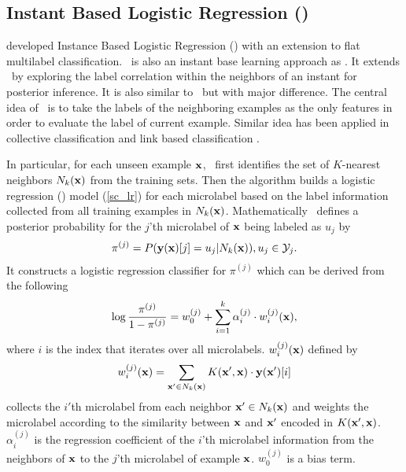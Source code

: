 {%
%
\subsection{Instant Based Logistic Regression (\iblr)} \label{sc_iblr}

\citet{Cheng09combining} developed Instance Based Logistic Regression (\iblr) with an extension to flat multilabel classification.
\iblr\ is also an instant base learning approach \citep{Aha91instance} as \mlknn.
It extends \mlknn\ by exploring the label correlation within the neighbors of an instant for posterior inference.
It is also similar to \cc\ but with major difference.
The central idea of \iblr\ is to take the labels of the neighboring examples as the only features in order to evaluate the label of current example.
Similar idea has been applied in collective classification \citep{Ghamrawi05collective} and link based classification \citep{Getoor05link, Getoor07introduction}.

In particular, for each unseen example $\mathbf {x}$, \iblr\ first identifies the set of $K$-nearest neighbors $N_k(\mathbf {x})$ from the training sets.
Then the algorithm builds a logistic regression (\lr) model (\ref{sc_lr}) for each microlabel based on the label information collected from all training examples in $N_k(\mathbf {x})$.
Mathematically \iblr\ defines a posterior probability for the $j$'th microlabel of $\mathbf {x}$ being labeled as $u_j$ by
\begin{align*}
	\pi^{(j)} = P( \mathbf {y}(\mathbf {x})[j]=u_j | N_k(\mathbf {x})), u_j\in\mathcal{Y}_j.
\end{align*}
It constructs a logistic regression classifier for $\pi^{(j)}$ which can be derived from the following 
\begin{align*}
	\log\frac{\pi^{(j)}}{1-\pi^{(j)}} = w_0^{(j)} + \sum_{i=1}^{k}\alpha_i^{(j)}\cdot w_{i}^{(j)}(\mathbf {x}),
\end{align*}
where $i$ is the index that iterates over all microlabels.
$w_i^{(j)}(\mathbf {x})$ defined by 
\begin{align*}
	w_i^{(j)}(\mathbf {x}) = \sum_{\mathbf {x}'\in N_k(\mathbf {x})}K(\mathbf {x}',\mathbf {x})\cdot \mathbf {y}(\mathbf {x}')[i]
\end{align*}
collects the $i'$th microlabel from each neighbor $\mathbf {x}'\in N_k(\mathbf {x})$ and weights the microlabel according to the similarity between $\mathbf {x}$ and $\mathbf {x}'$ encoded in $K(\mathbf {x}',\mathbf {x})$.
$\alpha_i^{(j)}$ is the regression coefficient of the $i$'th microlabel information from the neighbors of $\mathbf {x}$ to the $j$'th microlabel of example $\mathbf {x}$.
$w_0^{(j)}$ is a bias term.



}
